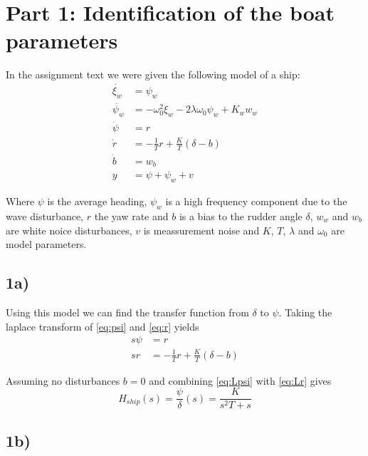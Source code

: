 \section{Part 1: Identification of the boat  parameters}

In the assignment text we were given the following model of a ship:
\begin{subequations}
	\label{eq:completeModel}
		\begin{align}
				\dot{\xi_w} &= \psi_w \label{eq:xi_w}\\
				\dot{\psi_w} &= -\omega_0^2\xi_w-2\lambda\omega_0\psi_w+K_ww_w \label{eq:psi_w}\\
				\dot{\psi} &= r \label{eq:psi} \\
				\dot{r} &= -\frac{1}{T}r+\frac{K}{T}(\delta-b) \label{eq:r} \\
				\dot{b} &= w_b \label{eq:b} \\
				y &= \psi + \psi_w + v \label{eq:y}
		\end{align}
\end{subequations}

Where $\psi$ is the average heading, $\psi_w$ is a high frequency component due to the wave disturbance, $r$ the yaw rate and $b$ is a bias to the rudder angle $\delta$, $w_w$ and $w_b$ are white noice disturbances, $v$ is meassurement noise and $K$, $T$, $\lambda$ and $\omega_0$ are model parameters.


\subsection{1a)}

Using this model we can find the transfer function from $\delta$ to $\psi$. Taking the laplace transform of \cref{eq:psi} and \cref{eq:r} yields
\begin{subequations}
	\begin{align}
		s\psi &= r \label{eq:Lpsi}\\
		sr &= -\frac{1}{T}r + \frac{K}{T}(\delta-b) \label{eq:Lr}
	\end{align}
\end{subequations}

Assuming no disturbances $b = 0$ and combining \cref{eq:Lpsi} with \cref{eq:Lr} gives
\begin{equation}
	H_{ship}(s) = \frac{\psi}{\delta}(s) = \frac{K}{s^2T+s} \label{eq:H(s)}
\end{equation}

\subsection{1b)}

